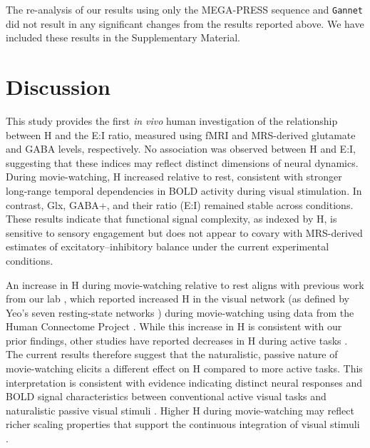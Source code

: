 \documentclass[
true
]{sn-jnl}
\begin{document}
The re-analysis of our results using only the MEGA-PRESS sequence and
\texttt{Gannet} did not result in any significant changes from the
results reported above. We have included these results in the
Supplementary Material.

\section{Discussion}\label{discussion}

This study provides the first \emph{in vivo} human investigation of the
relationship between H and the E:I ratio, measured using fMRI and
MRS-derived glutamate and GABA levels, respectively. No association was
observed between H and E:I, suggesting that these indices may reflect
distinct dimensions of neural dynamics. During movie-watching, H
increased relative to rest, consistent with stronger long-range temporal
dependencies in BOLD activity during visual stimulation. In contrast,
Glx, GABA+, and their ratio (E:I) remained stable across conditions.
These results indicate that functional signal complexity, as indexed by
H, is sensitive to sensory engagement but does not appear to covary with
MRS-derived estimates of excitatory--inhibitory balance under the
current experimental conditions.

An increase in H during movie-watching relative to rest aligns with
previous work from our lab \citep{campbellFractalBasedAnalysisFMRI2022},
which reported increased H in the visual network (as defined by Yeo's
seven resting-state networks
\citep{thomasyeoOrganizationHumanCerebral2011}) during movie-watching
using data from the Human Connectome Project
\citep{vanessenHumanConnectomeProject2012}. While this increase in H is
consistent with our prior findings, other studies have reported
decreases in H during active tasks
\citep{heScaleFreePropertiesFunctional2011, churchillSuppressionScalefreeFMRI2016, ciuciuInterplayFunctionalConnectivity2014, barnesEndogenousHumanBrain2009}.
The current results therefore suggest that the naturalistic, passive
nature of movie-watching elicits a different effect on H compared to
more active tasks. This interpretation is consistent with evidence
indicating distinct neural responses and BOLD signal characteristics
between conventional active visual tasks and naturalistic passive visual
stimuli
\citep{campbellFractalBasedAnalysisFMRI2022, hassonReliabilityCorticalActivity2010}.
Higher H during movie-watching may reflect richer scaling properties
that support the continuous integration of visual stimuli
\citep{campbellFractalBasedAnalysisFMRI2022}.
\end{document}
